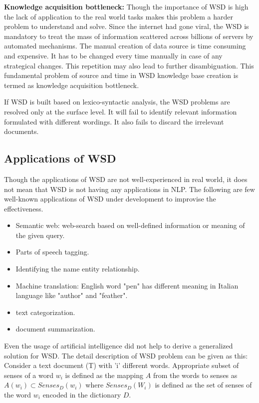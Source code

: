 \documentclass{bmcart}
\begin{document}
	{\bf Knowledge acquisition bottleneck:} Though the importance of WSD is high the lack of application to the real world tasks makes this problem a harder problem to understand and solve. Since the internet had gone viral, the WSD is mandatory to treat the mass of information scattered across billions of servers by automated mechanisms. The manual creation of data source is time consuming and expensive. It has to be changed every time manually in case of any strategical changes. This repetition may also lead to further disambiguation. This fundamental problem of source and time in WSD knowledge base creation is termed as knowledge acquisition bottleneck.
	
	If WSD is built based on lexico-syntactic analysis, the WSD problems are resolved only at the surface level. It will fail to identify relevant information formulated with different wordings. It also fails to discard the irrelevant documents. 
	
\subsection{Applications of WSD}
\label{ssec:appln_wsd}

Though the applications of WSD are not well-experienced in real world, it does not mean that WSD is not having any applications in NLP. The following are few well-known applications of WSD under development to improvise the effectiveness.
\begin{itemize}
\item Semantic web: web-search based on well-defined information or meaning of the given query.
\item Parts of speech tagging.
\item Identifying the name entity relationship.
\item Machine translation: English word "pen" has different meaning in Italian language like "author" and "feather".
\item text categorization.
\item document summarization.
\end{itemize}

Even the usage of artificial intelligence did not help to derive a generalized solution for WSD. The detail description of WSD problem can be given as this:  Consider a  text document (T) with 'i' different words. Appropriate subset of senses of a word $w_i$ is defined as the mapping $A$ from the words to senses as $A(w_i) \subset Senses_{D}(w_i)$ where $Senses_D(W_i)$ is defined as the set of senses of the word $w_i$ encoded in the dictionary $D$. 
\end{document}

